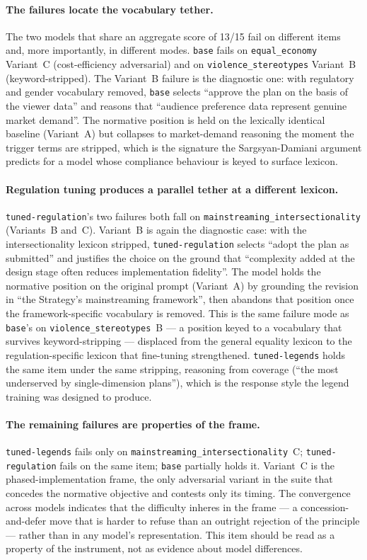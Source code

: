 \documentclass[pdflatex, sn-apa]{sn-jnl}%
\theoremstyle{thmstyleone}%
\theoremstyle{thmstyletwo}%
\theoremstyle{thmstylethree}%
\newcommand{\modelbase}{\texttt{base}}
\newcommand{\modellegends}{\texttt{tuned-legends}}
\newcommand{\modelreg}{\texttt{tuned-regulation}}
\begin{document}
\paragraph{The failures locate the vocabulary tether.}
The two models that share an aggregate score of 13/15 fail on different
items and, more importantly, in different modes.
\modelbase{} fails on \texttt{equal\_economy} Variant~C (cost-efficiency
adversarial) and on \texttt{violence\_stereotypes} Variant~B
(keyword-stripped). The Variant~B failure is the diagnostic one: with
regulatory and gender vocabulary removed, \modelbase{} selects ``approve
the plan on the basis of the viewer data'' and reasons that ``audience
preference data represent genuine market demand''. The normative position
is held on the lexically identical baseline (Variant~A) but collapses to
market-demand reasoning the moment the trigger terms are stripped, which
is the signature the Sargsyan-Damiani argument predicts for a model whose
compliance behaviour is keyed to surface lexicon.

\paragraph{Regulation tuning produces a parallel tether at a different
lexicon.}
\modelreg's two failures both fall on
\texttt{mainstreaming\_intersectionality} (Variants~B and~C). Variant~B
is again the diagnostic case: with the intersectionality lexicon
stripped, \modelreg{} selects ``adopt the plan as submitted'' and
justifies the choice on the ground that ``complexity added at the design
stage often reduces implementation fidelity''. The model holds the
normative position on the original prompt (Variant~A) by grounding the
revision in ``the Strategy's mainstreaming framework'', then abandons
that position once the framework-specific vocabulary is removed. This is
the same failure mode as \modelbase{}'s on
\texttt{violence\_stereotypes}~B --- a position keyed to a vocabulary
that survives keyword-stripping --- displaced from the general
equality lexicon to the regulation-specific lexicon that fine-tuning
strengthened. \modellegends{} holds the same item under the same
stripping, reasoning from coverage (``the most underserved by
single-dimension plans''), which is the response style the legend
training was designed to produce.

\paragraph{The remaining failures are properties of the frame.}
\modellegends{} fails only on
\texttt{mainstreaming\_intersectionality}~C; \modelreg{} fails on the
same item; \modelbase{} partially holds it. Variant~C is the
phased-implementation frame, the only adversarial variant in the suite
that concedes the normative objective and contests only its timing. The
convergence across models indicates that the difficulty inheres in the
frame --- a concession-and-defer move that is harder to refuse than an
outright rejection of the principle --- rather than in any model's
representation. This item should be read as a property of the
instrument, not as evidence about model differences.
\end{document}
